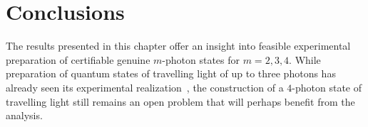 \documentclass{article}
\begin{document}
%
%

\FloatBarrier
\section{Conclusions}

The results presented in this chapter offer an insight into feasible experimental preparation of certifiable genuine $m$-photon states for $m = 2, 3, 4$. While preparation of quantum states of travelling light of up to three photons has already seen its experimental realization~\cite{yukawa2013a}, the construction of a $4$-photon state of travelling light still remains an open problem that will perhaps benefit from the analysis.

%
% 

\FloatBarrier
\printbibliography[heading = bibnumbered]
\end{document}
